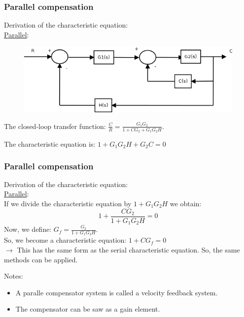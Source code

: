 \begin{frame}
	\frametitle{Parallel compensation}
	Derivation of the characteristic equation:\\
	\underline{Parallel}:
	\begin{figure}
		\centering
		\includegraphics[width=0.9\linewidth]{Parallel_compensator}
	\end{figure}
	The closed-loop transfer function: $\frac{C}{R}=\frac{G_1G_2}{1+CG_2+G_1G_2H}$.\vspace{3mm}
	
	The characteristic equation is: $1+G_1G_2H+G_2C=0$
\end{frame}

\begin{frame}
	\frametitle{Parallel compensation}
	Derivation of the characteristic equation:\\
	\underline{Parallel}:\\
	If we divide the characteristic equation by $1+G_1G_2H$ we obtain: $$1+\frac{CG_2}{1+G_1G_2H}=0$$
	Now, we define: $G_f=\frac{G_2}{1+G_1G_2H}$.\\
	So, we become a characteristic equation: $1+CG_f=0$\\
	$\rightarrow$ This has the same form as the serial characteristic equation. So, the same methods can be applied. 
	\vspace{3mm}
	
	Notes:
	\begin{itemize}
	\item A paralle compensator system is called a velocity feedback system.
	\item The compensator can be saw as a gain element.
	\end{itemize}
\end{frame}

